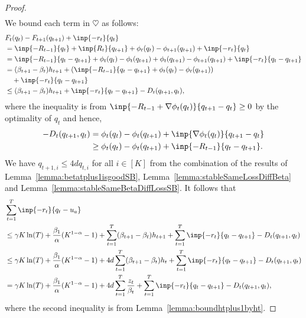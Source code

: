 \begin{proof}
\begin{align*}
\end{align*}
We bound each term in $\heartsuit$ as follows:
\begin{align*}
    &F_t(q_t) - F_{t+1}(q_{t+1}) + \inp{-r_t}{q_t} \\
    &= \inp{-R_{t-1}}{q_t} + \inp{R_t}{q_{t+1}} + \phi_t(q_t) - \phi_{t+1}(q_{t+1}) + \inp{-r_t}{q_t} \\
    &= \inp{-R_{t-1}}{q_t - q_{t+1}} + \phi_t(q_t) - \phi_{t}(q_{t+1}) + \phi_{t}(q_{t+1}) - \phi_{t+1}(q_{t+1}) + \inp{-r_t}{q_t - q_{t+1}} \\
    &= (\beta_{t+1} - \beta_t)h_{t+1} + (\inp{-R_{t-1}}{q_t - q_{t+1}} + \phi_t(q_t) - \phi_{t}(q_{t+1})) \\
    &\quad + \inp{-r_t}{q_t - q_{t+1}}\\
    &\leq (\beta_{t+1} - \beta_t)h_{t+1} + \inp{-r_t}{q_t - q_{t+1}} - D_t(q_{t+1}, q_t),
\end{align*}
where the inequality is from $\inp{-R_{t-1} + \nabla \phi_t(q_t)}{q_{t+1} - q_t} \geq 0$ by the optimality of $q_t$ and hence,
\begin{align*}
    -D_t(q_{t+1}, q_t) &= \phi_t(q_t)  -\phi_t(q_{t+1}) + \inp{\nabla \phi_t(q_t)}{q_{t+1} - q_t} \\
    &\geq \phi_t(q_t) - \phi_t(q_{t+1})  + \inp{-R_{t-1}}{q_t - q_{t+1}}.
\end{align*}
We have $q_{t+1,i} \leq 4dq_{t,i}$ for all $i \in [K]$ from the combination of the results of Lemma~\ref{lemma:betatplus1isgoodSB}, Lemma~\ref{lemma:stableSameLossDiffBeta} and Lemma~\ref{lemma:stableSameBetaDiffLossSB}.
It follows that 
\begin{align*}
    &\sum_{t=1}^T \inp{-r_t}{q_t - u_a} \\
    &\leq \gamma K\ln(T) + \frac{\beta_1}{\alpha}(K^{1-\alpha}-1) + \sum_{t=1}^T (\beta_{t+1} - \beta_t)h_{t+1} + \sum_{t=1}^T\inp{-r_t}{q_t - q_{t+1}} - D_t(q_{t+1}, q_t) \\
    &\leq  \gamma K\ln(T) + \frac{\beta_1}{\alpha}(K^{1-\alpha}-1) + 4d\sum_{t=1}^T (\beta_{t+1} - \beta_t)h_{t} +  \sum_{t=1}^T\inp{-r_t}{q_t - q_{t+1}} - D_t(q_{t+1}, q_t) \\
    &= \gamma K\ln(T) + \frac{\beta_1}{\alpha}(K^{1-\alpha}-1) + 4d\sum_{t=1}^T \frac{z_t}{\beta_t} +  \sum_{t=1}^T\inp{-r_t}{q_t - q_{t+1}} - D_t(q_{t+1}, q_t),
\end{align*}
where the second inequality is from Lemma~\ref{lemma:boundhtplus1byht}.



\end{proof}
